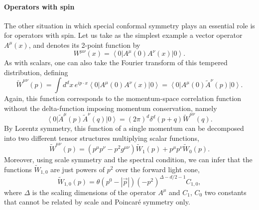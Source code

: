 \documentclass[a4paper,12pt]{article}
\newcommand{\ket}[1]{\left| #1 \right\rangle}
\newcommand{\bra}[1]{\left\langle #1 \right|}
\numberwithin{equation}{section}
\begin{document}
\paragraph{Operators with spin}

The other situation in which special conformal symmetry plays an essential role is for operators with spin.
Let us take as the simplest example a vector operator $A^\mu(x)$, and denotes its 2-point function by
\begin{equation}
	W^{\mu\nu}(x) = \bra{0} A^\mu(0) A^\nu(x) \ket{0}.
\end{equation}
As with scalars, one can also take the Fourier transform of this tempered distribution, defining
\begin{equation}
	\widetilde{W}^{\mu\nu}(p) = \int d^dx \, e^{i p \cdot x}
	\bra{0} A^\mu(0) A^\nu(x) \ket{0}
	= \bra{0} A^\mu(0) \widetilde{A}^\nu(p) \ket{0}.
	\label{eq:vector:mixedrep}
\end{equation}
Again, this function corresponds to the momentum-space correlation function without the delta-function imposing momentum conservation, namely
\begin{equation}
	\bra{0} \widetilde{A}^\mu(p) \widetilde{A}^\nu(q) \ket{0}
	= (2\pi)^d \delta^d(p + q) \widetilde{W}^{\mu\nu}(q).
\end{equation}
By Lorentz symmetry, this function of a single momentum can be decomposed into two different tensor structures multiplying scalar functions,
\begin{equation}
	\widetilde{W}^{\mu\nu}(p)
	= (p^\mu p^\nu - p^2 g^{\mu\nu}) \widetilde{W}_1(p)
	+ p^\mu p^\nu \widetilde{W}_0(p).
	\label{eq:vector:polarizations}
\end{equation}
Moreover, using scale symmetry and the spectral condition, we can infer that the functions $\widetilde{W}_{1,0}$ are just powers of $p^2$ over the forward light cone,
\begin{equation}
	\widetilde{W}_{1,0}(p)
	= \theta\left( p^0 - \left| \vec{p} \right| \right)
	(-p^2)^{\Delta - d/2 - 1} C_{1,0},
\end{equation}
where $\Delta$ is the scaling dimensions of the operator $A^\mu$ and $C_1$, $C_0$ two constants that cannot be related by scale and Poincaré symmetry only.
\end{document}
